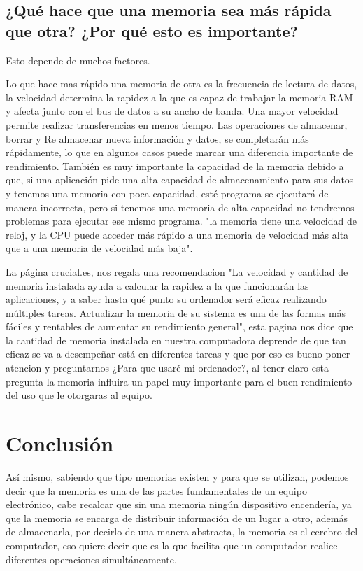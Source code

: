 \documentclass{article}
\begin{document}
\subsection{¿Qué hace que una memoria sea más rápida que otra? ¿Por qué esto es importante?}

Esto depende de muchos factores. \newline

Lo que hace mas rápido una memoria de otra es la  frecuencia  de lectura  de  datos, la velocidad determina la rapidez a la que es capaz de trabajar la memoria RAM y afecta junto con el bus de datos a su ancho de banda. Una mayor velocidad permite realizar transferencias en menos tiempo. Las operaciones de almacenar,  borrar  y  Re  almacenar  nueva  información  y  datos, se  completarán más rápidamente, lo que en algunos casos puede marcar una diferencia importante de rendimiento. También es muy importante la capacidad de la memoria debido a que, si una aplicación pide una alta capacidad de almacenamiento para sus datos y tenemos una memoria con poca capacidad, esté programa se ejecutará de manera incorrecta, pero si tenemos una memoria de alta capacidad no tendremos problemas para ejecutar ese mismo programa. 
\cite{mycomputer} "la memoria tiene una velocidad de reloj, y la CPU puede acceder más rápido a una memoria de velocidad más alta que a una memoria de velocidad más baja".

La página crucial.es, nos regala una recomendacion \cite{uso} "La velocidad y cantidad de memoria instalada ayuda a calcular la rapidez a la que funcionarán las aplicaciones, y a saber hasta qué punto su ordenador será eficaz realizando múltiples tareas. Actualizar la memoria de su sistema es una de las formas más fáciles y rentables de aumentar su rendimiento general", esta pagina nos dice que la cantidad de memoria instalada en nuestra computadora deprende de que tan eficaz se va a desempeñar está en diferentes tareas y que por eso es bueno poner atencion y preguntarnos ¿Para que usaré mi ordenador?, al tener claro esta pregunta la memoria influira un papel muy importante para el buen rendimiento del uso que le otorgaras al equipo.

\section{Conclusión} \label{conclulsion}

Así mismo, sabiendo que tipo memorias existen y para que se utilizan, podemos decir que la memoria es una de las partes fundamentales de un equipo electrónico, cabe  recalcar  que  sin  una  memoria  ningún  dispositivo  encendería, ya  que  la  memoria  se  encarga  de  distribuir  información  de  un  lugar  a otro, además de almacenarla,  por  decirlo  de  una  manera  abstracta,  la memoria es el cerebro del computador, eso quiere decir que es la que facilita que un computador realice diferentes operaciones simultáneamente.

 \newline



\printbibliography
\end{document}
